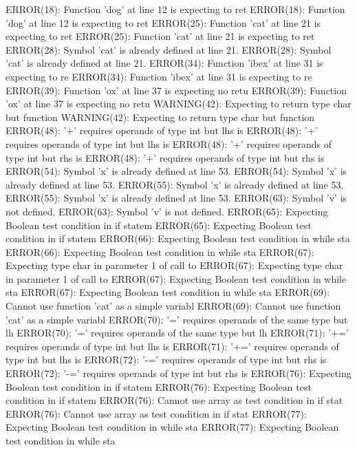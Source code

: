 \documentclass[12pt]{book}
\begin{document}
ERROR(18): Function 'dog' at line 12 is expecting to ret        ERROR(18): Function 'dog' at line 12 is expecting to ret
ERROR(25): Function 'cat' at line 21 is expecting to ret        ERROR(25): Function 'cat' at line 21 is expecting to ret
ERROR(28): Symbol 'cat' is already defined at line 21.                ERROR(28): Symbol 'cat' is already defined at line 21.
ERROR(34): Function 'ibex' at line 31 is expecting to re        ERROR(34): Function 'ibex' at line 31 is expecting to re
ERROR(39): Function 'ox' at line 37 is expecting no retu        ERROR(39): Function 'ox' at line 37 is expecting no retu
WARNING(42): Expecting to return type char but function         WARNING(42): Expecting to return type char but function 
ERROR(48): '+' requires operands of type int but lhs is         ERROR(48): '+' requires operands of type int but lhs is 
ERROR(48): '+' requires operands of type int but rhs is         ERROR(48): '+' requires operands of type int but rhs is 
ERROR(54): Symbol 'x' is already defined at line 53.                ERROR(54): Symbol 'x' is already defined at line 53.
ERROR(55): Symbol 'x' is already defined at line 53.                ERROR(55): Symbol 'x' is already defined at line 53.
ERROR(63): Symbol 'v' is not defined.                                ERROR(63): Symbol 'v' is not defined.
ERROR(65): Expecting Boolean test condition in if statem        ERROR(65): Expecting Boolean test condition in if statem
ERROR(66): Expecting Boolean test condition in while sta        ERROR(66): Expecting Boolean test condition in while sta
ERROR(67): Expecting type char in parameter 1 of call to        ERROR(67): Expecting type char in parameter 1 of call to
ERROR(67): Expecting Boolean test condition in while sta        ERROR(67): Expecting Boolean test condition in while sta
ERROR(69): Cannot use function 'cat' as a simple variabl        ERROR(69): Cannot use function 'cat' as a simple variabl
ERROR(70): '=' requires operands of the same type but lh        ERROR(70): '=' requires operands of the same type but lh
ERROR(71): '+=' requires operands of type int but lhs is        ERROR(71): '+=' requires operands of type int but lhs is
ERROR(72): '-=' requires operands of type int but rhs is        ERROR(72): '-=' requires operands of type int but rhs is
ERROR(76): Expecting Boolean test condition in if statem        ERROR(76): Expecting Boolean test condition in if statem
ERROR(76): Cannot use array as test condition in if stat        ERROR(76): Cannot use array as test condition in if stat
ERROR(77): Expecting Boolean test condition in while sta        ERROR(77): Expecting Boolean test condition in while sta
\end{document}
